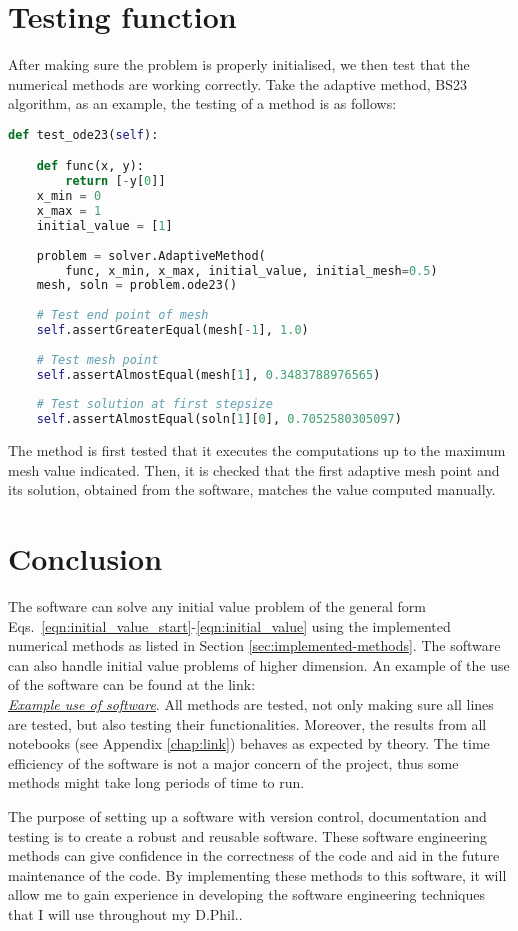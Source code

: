 \section{Testing function}
\label{sec:test_func}
After making sure the problem is properly initialised, we then test that the numerical methods are working correctly. Take the adaptive method, BS23 algorithm, as an example, the testing of a method is as follows: 
\begin{lstlisting}[language=Python, caption= {testing of function}, title={Testing execution of method}, label={code:test_func}]
def test_ode23(self):

    def func(x, y):
        return [-y[0]]
    x_min = 0
    x_max = 1
    initial_value = [1]
    
    problem = solver.AdaptiveMethod(
        func, x_min, x_max, initial_value, initial_mesh=0.5)
    mesh, soln = problem.ode23()
    
    # Test end point of mesh
    self.assertGreaterEqual(mesh[-1], 1.0)
    
    # Test mesh point
    self.assertAlmostEqual(mesh[1], 0.3483788976565)
    
    # Test solution at first stepsize
    self.assertAlmostEqual(soln[1][0], 0.7052580305097)
\end{lstlisting}
The method is first tested that it executes the computations up to the maximum mesh value indicated. Then, it is checked that the first adaptive mesh point and its solution, obtained from the software, matches the value computed manually. 

\section{Conclusion}
\label{sec:software-conclusion}
The software can solve any initial value problem of the general form Eqs.~\eqref{eqn:initial_value_start}-\eqref{eqn:initial_value} using the implemented numerical methods as listed in Section \ref{sec:implemented-methods}. The software can also handle initial value problems of higher dimension. An example of the use of the software can be found at the link: \\ \href{https://nbviewer.jupyter.org/github/FarmHJ/numerical-solver/blob/main/examples/fitzhugh_nagumo.ipynb}{\underline{\emph{Example use of software}}}. All methods are tested, not only making sure all lines are tested, but also testing their functionalities. Moreover, the results from all notebooks (see Appendix \ref{chap:link}) behaves as expected by theory. The time efficiency of the software is not a major concern of the project, thus some methods might take long periods of time to run.

The purpose of setting up a software with version control, documentation and testing is to create a robust and reusable software. These software engineering methods can give confidence in the correctness of the code and aid in the future maintenance of the code. By implementing these methods to this software, it will allow me to gain experience in developing the software engineering techniques that I will use throughout my D.Phil..

